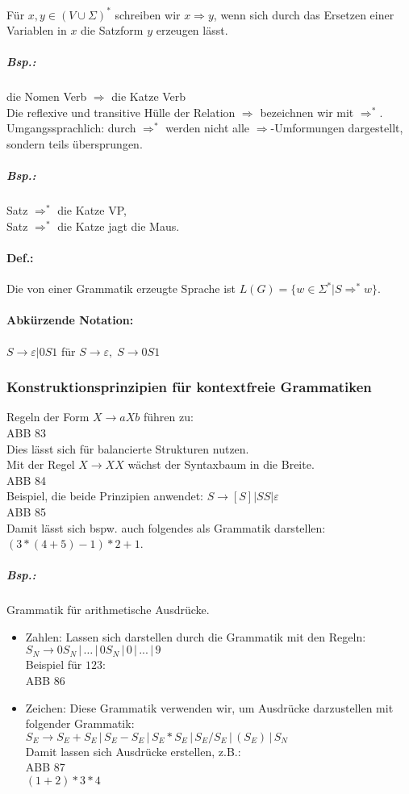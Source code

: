 Für $x,y\in (V \cup \Sigma)^*$ schreiben wir $x \Rightarrow y$, wenn sich durch das Ersetzen einer Variablen in $x$ die Satzform $y$ erzeugen lässt.
\subparagraph{Bsp.:} die Nomen Verb $\Rightarrow$ die Katze Verb\medskip\\
Die reflexive und transitive Hülle der Relation $\Rightarrow$ bezeichnen wir mit $\Rightarrow^*$. Umgangssprachlich: durch $\Rightarrow^*$ werden nicht alle $\Rightarrow$-Umformungen dargestellt, sondern teils übersprungen.
\subparagraph{Bsp.:} \parskp
Satz $\Rightarrow^*$ die Katze VP, \\
Satz $\Rightarrow^*$ die Katze jagt die Maus.
\paragraph{Def.:} Die von einer Grammatik erzeugte Sprache ist $L(G)=\{w\in \Sigma^* | S \Rightarrow^* w\}$.
\paragraph{Abkürzende Notation:} \parskp
$S\to \varepsilon | 0S1$ für $S\to \varepsilon, \; S \to 0S1$

\subsubsection{Konstruktionsprinzipien für kontextfreie Grammatiken}
Regeln der Form $X\to aXb$ führen zu:\\
ABB 83\\
Dies lässt sich für balancierte Strukturen nutzen.\\
Mit der Regel $X\to XX$ wächst der Syntaxbaum in die Breite.\\
ABB 84\\
Beispiel, die beide Prinzipien anwendet: $S\to [S] | SS | \varepsilon$\\
ABB 85\\
Damit lässt sich bspw. auch folgendes als Grammatik darstellen: $(3*(4+5)-1)*2+1$.
\subparagraph{Bsp.:} Grammatik für arithmetische Ausdrücke.
\begin{itemize}
\item Zahlen: Lassen sich darstellen durch die Grammatik mit den Regeln:\\
$S_N\to 0S_N\,|\,\dots \,|\, 0S_N \,|\, 0 \,|\, ... \,|\, 9$\\
Beispiel für $123$: \\
ABB 86
\item Zeichen: Diese Grammatik verwenden wir, um Ausdrücke darzustellen mit folgender Grammatik:\\
$S_E\to S_E+S_E \,|\, S_E - S_E \,|\, S_E*S_E \,|\, S_E/S_E \,|\, (S_E) \,|\, S_N$\\
Damit lassen sich Ausdrücke erstellen, z.B.:\\
ABB 87\\
$(1+2)*3*4$
\end{itemize}

